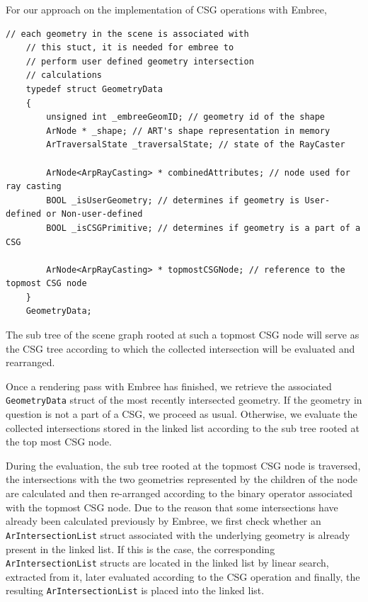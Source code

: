 For our approach on the implementation of CSG operations with Embree, 

\begin{listing} 
	\begin{lstlisting}[caption={Updated \texttt{GeometryData} struct for CSG rendering.}, label={lst:geometry_data_update1}]
	// each geometry in the scene is associated with
	// this stuct, it is needed for embree to
	// perform user defined geometry intersection
	// calculations
	typedef struct GeometryData 
	{
		unsigned int _embreeGeomID; // geometry id of the shape
		ArNode * _shape; // ART's shape representation in memory
		ArTraversalState _traversalState; // state of the RayCaster
		
		ArNode<ArpRayCasting> * combinedAttributes; // node used for ray casting
		BOOL _isUserGeometry; // determines if geometry is User-defined or Non-user-defined
		BOOL _isCSGPrimitive; // determines if geometry is a part of a CSG
		
		ArNode<ArpRayCasting> * topmostCSGNode; // reference to the topmost CSG node 
	}
	GeometryData;
	\end{lstlisting}
\end{listing}

The sub tree of the scene graph rooted at such a topmost CSG node will serve as the CSG tree according to which the collected intersection will be evaluated and rearranged.


Once a rendering pass with Embree has finished, we retrieve the associated \texttt{GeometryData} struct of the most recently intersected geometry. If the geometry in question is not a part of a CSG, we proceed as usual. Otherwise, we evaluate the collected intersections stored in the linked list according to the sub tree rooted at the top most CSG node. 

During the evaluation, the sub tree rooted at the topmost CSG node is traversed, the intersections with the two geometries represented by the children of the node are calculated and then re-arranged according to the binary operator associated with the topmost CSG node. Due to the reason that some intersections have already been calculated previously by Embree, we first check whether an \texttt{ArIntersectionList} struct associated with the underlying geometry is already present in the linked list. If this is the case, the corresponding \texttt{ArIntersectionList} structs are located in the linked list by linear search, extracted from it, later evaluated according to the CSG operation and finally, the resulting \texttt{ArIntersectionList} is placed into the linked list.


